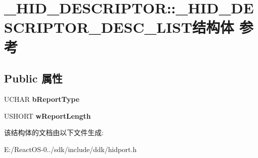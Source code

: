 \hypertarget{struct___h_i_d___d_e_s_c_r_i_p_t_o_r_1_1___h_i_d___d_e_s_c_r_i_p_t_o_r___d_e_s_c___l_i_s_t}{}\section{\+\_\+\+H\+I\+D\+\_\+\+D\+E\+S\+C\+R\+I\+P\+T\+OR\+:\+:\+\_\+\+H\+I\+D\+\_\+\+D\+E\+S\+C\+R\+I\+P\+T\+O\+R\+\_\+\+D\+E\+S\+C\+\_\+\+L\+I\+S\+T结构体 参考}
\label{struct___h_i_d___d_e_s_c_r_i_p_t_o_r_1_1___h_i_d___d_e_s_c_r_i_p_t_o_r___d_e_s_c___l_i_s_t}
\subsection*{Public 属性}
\begin{DoxyCompactItemize}
\item 
\mbox{\label{struct___h_i_d___d_e_s_c_r_i_p_t_o_r_1_1___h_i_d___d_e_s_c_r_i_p_t_o_r___d_e_s_c___l_i_s_t_a3661237c8e3f3246eea2d378d934156f}} 
U\+C\+H\+AR {\bfseries b\+Report\+Type}
\item 
\mbox{\label{struct___h_i_d___d_e_s_c_r_i_p_t_o_r_1_1___h_i_d___d_e_s_c_r_i_p_t_o_r___d_e_s_c___l_i_s_t_a6c70919a1173179930dc4ae093a8d509}} 
U\+S\+H\+O\+RT {\bfseries w\+Report\+Length}
\end{DoxyCompactItemize}


该结构体的文档由以下文件生成\+:\begin{DoxyCompactItemize}
\item 
E\+:/\+React\+O\+S-\/0../sdk/include/ddk/hidport.\+h\end{DoxyCompactItemize}

